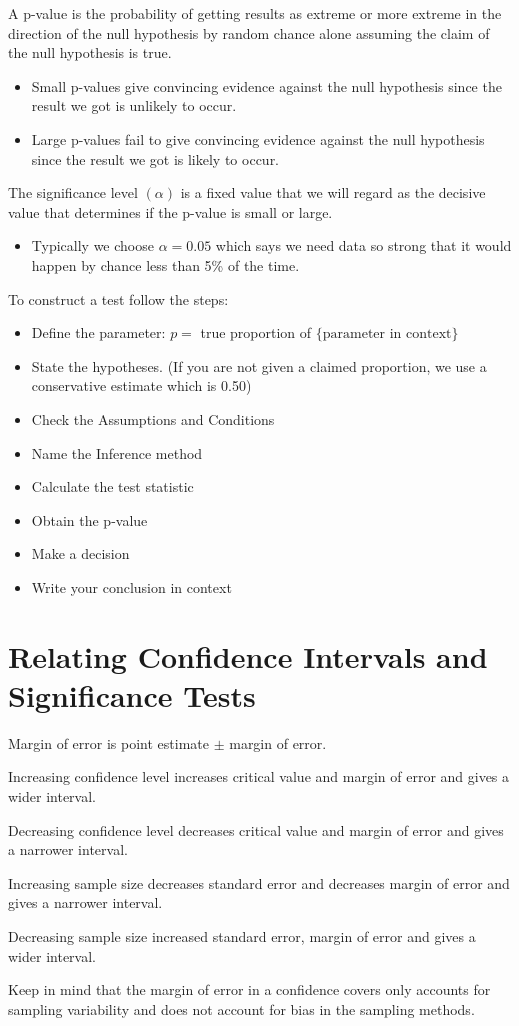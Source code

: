 \documentclass[../stats.tex]{subfiles}
\begin{document}
A p-value is the probability of getting results as extreme or more extreme in the direction of the null hypothesis by random chance alone assuming the claim of the null hypothesis is true.
\begin{itemize}
    \item Small p-values give convincing evidence against the null hypothesis since the result we got is unlikely to occur.
    \item Large p-values fail to give convincing evidence against the null hypothesis since the result we got is likely to occur.
\end{itemize}
The significance level $(\alpha)$ is a fixed value that we will regard as the decisive value that determines if the p-value is small or large.
\begin{itemize}
    \item Typically we choose $\alpha = 0.05$ which says we need data so strong that it would happen by chance less than 5\% of the time.
\end{itemize}

To construct a test follow the steps:
\begin{itemize}
    \item Define the parameter: $p=$ true proportion of $\{\text{parameter in context}\}$
    \item State the hypotheses. (If you are not given a claimed proportion, we use a conservative estimate which is 0.50)
    \item Check the Assumptions and Conditions 
    \item Name the Inference method 
    \item Calculate the test statistic
    \item Obtain the p-value 
    \item Make a decision 
    \item Write your conclusion in context 
\end{itemize}

\section{Relating Confidence Intervals and Significance Tests}
Margin of error is point estimate $\pm$ margin of error. 

Increasing confidence level increases critical value and margin of error and gives a wider interval.

Decreasing confidence level decreases critical value and margin of error and gives a narrower interval.

Increasing sample size decreases standard error and decreases margin of error and gives a narrower interval.

Decreasing sample size increased standard error, margin of error and gives a wider interval.

Keep in mind that the margin of error in a confidence covers only accounts for sampling variability and does not account for bias in the sampling methods.
\end{document}
